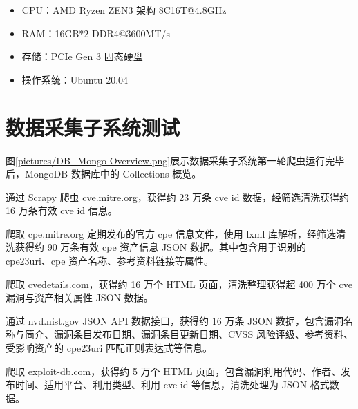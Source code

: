 \documentclass[a4paper,AutoFakeBold,oneside,12pt]{book}
\begin{document}
\begin{itemize}
	\item CPU：AMD Ryzen ZEN3 架构 8C16T@4.8GHz
	\item RAM：16GB*2 DDR4@3600MT/s
	\item 存储：PCIe Gen 3 固态硬盘
	\item 操作系统：Ubuntu 20.04
\end{itemize}

\section{数据采集子系统测试}

图\ref{pictures/DB_Mongo-Overview.png}展示数据采集子系统第一轮爬虫运行完毕后，MongoDB 数据库中的 Collections 概览。


通过 Scrapy 爬虫 cve.mitre.org，获得约 23 万条 cve id 数据，经筛选清洗获得约 16 万条有效 cve id 信息。%


爬取 cpe.mitre.org 定期发布的官方 cpe 信息文件，使用 lxml 库解析，经筛选清洗获得约 90 万条有效 cpe 资产信息 JSON 数据。其中包含用于识别的 cpe23uri、cpe 资产名称、参考资料链接等属性。%


爬取 cvedetails.com，获得约 16 万个 HTML 页面，清洗整理获得超 400 万个 cve 漏洞与资产相关属性 JSON 数据。%


通过 nvd.nist.gov JSON API 数据接口，获得约 16 万条 JSON 数据，包含漏洞名称与简介、漏洞条目发布日期、漏洞条目更新日期、CVSS 风险评级、参考资料、受影响资产的 cpe23uri 匹配正则表达式等信息。%


爬取 exploit-db.com，获得约 5 万个 HTML 页面，包含漏洞利用代码、作者、发布时间、适用平台、利用类型、利用 cve id 等信息，清洗处理为 JSON 格式数据。%
\end{document}
